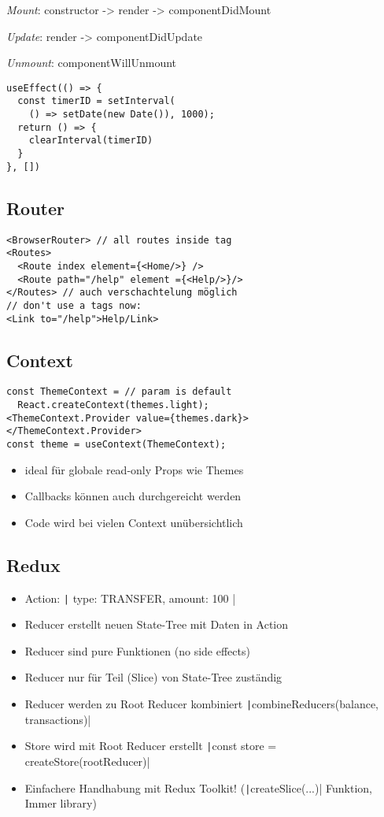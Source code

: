 \begin{multicols*}{4}
\textit{Mount}: constructor -> render -> componentDidMount

\textit{Update}: render -> componentDidUpdate

\textit{Unmount}: componentWillUnmount

\begin{verbatim}
useEffect(() => {
  const timerID = setInterval(
    () => setDate(new Date()), 1000);
  return () => {
    clearInterval(timerID)
  }
}, [])
\end{verbatim}

\subsection{Router}
\begin{verbatim}
<BrowserRouter> // all routes inside tag
<Routes>
  <Route index element={<Home/>} />
  <Route path="/help" element ={<Help/>}/>
</Routes> // auch verschachtelung möglich
// don't use a tags now:
<Link to="/help">Help/Link>
\end{verbatim}

\subsection{Context}
\begin{verbatim}
const ThemeContext = // param is default
  React.createContext(themes.light);
<ThemeContext.Provider value={themes.dark}>
</ThemeContext.Provider>
const theme = useContext(ThemeContext);
\end{verbatim}
\begin{itemize}
    \item ideal für globale read-only Props wie Themes
    \item Callbacks können auch durchgereicht werden
    \item Code wird bei vielen Context unübersichtlich
\end{itemize}

\subsection{Redux}
\begin{itemize}
    \item Action: \texttt|{ type: TRANSFER, amount: 100 }|
    \item Reducer erstellt neuen State-Tree mit Daten in Action
    \item Reducer sind pure Funktionen (no side effects)
    \item Reducer nur für Teil (Slice) von State-Tree zuständig
    \item Reducer werden zu Root Reducer kombiniert \texttt|combineReducers({balance, transactions})|
    \item Store wird mit Root Reducer erstellt \texttt|const store = createStore(rootReducer)|
    \item Einfachere Handhabung mit Redux Toolkit! (\texttt|createSlice({...})| Funktion, Immer library)
\end{itemize}


\end{multicols*}
